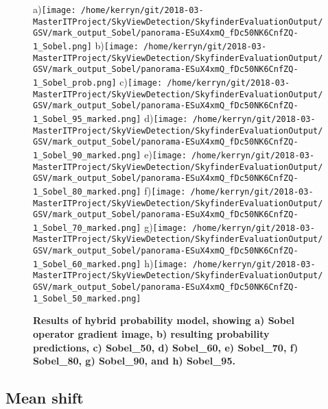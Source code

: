 \documentclass[final,3p,times,authoryear]{elsarticle}
\begin{document}
\begin{figure}
\centering    
a)\texttt{[image: /home/kerryn/git/2018-03-MasterITProject/SkyViewDetection/SkyfinderEvaluationOutput/GSV/mark\_output\_Sobel/panorama-ESuX4xmQ\_fDc50NK6CnfZQ-1\_Sobel.png]} 
b)\texttt{[image: /home/kerryn/git/2018-03-MasterITProject/SkyViewDetection/SkyfinderEvaluationOutput/GSV/mark\_output\_Sobel/panorama-ESuX4xmQ\_fDc50NK6CnfZQ-1\_Sobel\_prob.png]} 
c)\texttt{[image: /home/kerryn/git/2018-03-MasterITProject/SkyViewDetection/SkyfinderEvaluationOutput/GSV/mark\_output\_Sobel/panorama-ESuX4xmQ\_fDc50NK6CnfZQ-1\_Sobel\_95\_marked.png]} 
d)\texttt{[image: /home/kerryn/git/2018-03-MasterITProject/SkyViewDetection/SkyfinderEvaluationOutput/GSV/mark\_output\_Sobel/panorama-ESuX4xmQ\_fDc50NK6CnfZQ-1\_Sobel\_90\_marked.png]} 
e)\texttt{[image: /home/kerryn/git/2018-03-MasterITProject/SkyViewDetection/SkyfinderEvaluationOutput/GSV/mark\_output\_Sobel/panorama-ESuX4xmQ\_fDc50NK6CnfZQ-1\_Sobel\_80\_marked.png]} 
f)\texttt{[image: /home/kerryn/git/2018-03-MasterITProject/SkyViewDetection/SkyfinderEvaluationOutput/GSV/mark\_output\_Sobel/panorama-ESuX4xmQ\_fDc50NK6CnfZQ-1\_Sobel\_70\_marked.png]} 
g)\texttt{[image: /home/kerryn/git/2018-03-MasterITProject/SkyViewDetection/SkyfinderEvaluationOutput/GSV/mark\_output\_Sobel/panorama-ESuX4xmQ\_fDc50NK6CnfZQ-1\_Sobel\_60\_marked.png]} 
h)\texttt{[image: /home/kerryn/git/2018-03-MasterITProject/SkyViewDetection/SkyfinderEvaluationOutput/GSV/mark\_output\_Sobel/panorama-ESuX4xmQ\_fDc50NK6CnfZQ-1\_Sobel\_50\_marked.png]} 
\caption{\bf  Results of hybrid probability model, showing a) Sobel operator gradient image, b) resulting probability predictions, c) Sobel\_50, d) Sobel\_60, e) Sobel\_70, f) Sobel\_80, g) Sobel\_90, and h) Sobel\_95.}    
 \label{fig:sobolresults}  
\end{figure} 







\subsection{Mean shift}\label{sec:mean}
\end{document}
